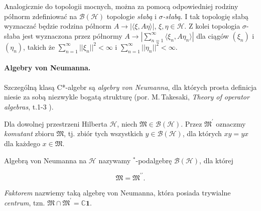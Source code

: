 Analogicznie do topologii mocnych, można za pomocą odpowiedniej rodziny
półnorm
zdefiniować na $\mathcal{B}(\mathcal{H})$ topologie \emph{słabą} i \emph{$\sigma$-słabą}.
I tak topologię słabą
wyznaczać będzie rodzina półnorm $A \rightarrow |\langle \xi, A \eta \rangle|$,
$\xi, \eta
\in \mathcal{H}$. Z kolei topologia $\sigma$-słaba jest wyznaczona
przez półnormy
$A \rightarrow \left| \sum \limits_{n=1}^{\infty} \langle \xi_{n}, A
\eta_{n}\rangle
\right|$ dla ciągów $(\xi_{n})$ i $(\eta_{n})$, takich że
$\sum \limits_{n=1}^{\infty} ||\xi_{n}||^{2} < \infty$ i
$\sum \limits_{n=1}^{\infty} ||\eta_{n}||^{2} < \infty$.

\paragraph{Algebry von Neumanna.}
Szczególną klasą C*-algebr są \emph{algebry von Neumanna},
dla których prosta definicja niesie za sobą niezwykle bogatą strukturę
(por. M.\,Takesaki, \emph{Theory of operator algebras}, t.1-3
\cite{Takesaki1, Takesaki2, Takesaki3}).

Dla dowolnej przestrzeni Hilberta $\mathcal{H}$,
niech $\mathfrak{M} \in \mathcal{B}(\mathcal{H})$.
Przez $\mathfrak{M}^{\prime}$ oznaczmy \emph{komutant} zbioru $\mathfrak{M}$,
tj. zbiór tych wszystkich $y \in \mathcal{B}(\mathcal{H})$,
dla których $x y = y x$ dla każdego $x \in \mathfrak{M}$.

\begin{Definition}
    \label{def:vNalgebras}
    Algebrą von Neumanna na $\mathcal{H}$ nazywamy $^{*}$-podalgebrę
    $\mathcal{B}(\mathcal{H})$, dla której
    \begin{linenomath*}
 \begin{equation}
        \mathfrak{M} = \mathfrak{M}^{\prime \prime}.
     \end{equation}
\end{linenomath*}
    \emph{Faktorem} nazwiemy taką algebrę von Neumanna, która posiada
    trywialne \emph{centrum}, tzn.
    $\mathfrak{M} \cap \mathfrak{M}^{\prime} = \mathbb{C} \mathbf{1}$.
\end{Definition}

